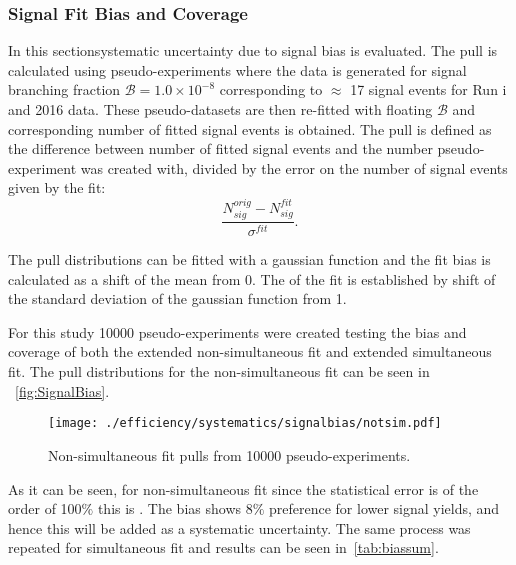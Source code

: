 \subsubsection{Signal Fit Bias and Coverage}
In this section\DIFaddbegin {}\DIFaddend systematic uncertainty due to signal bias is evaluated. The pull is calculated using pseudo-experiments where the data is generated for \DIFaddbegin {}\DIFaddend signal branching fraction $\mathcal{B}= 1.0\times 10^{-8}$ corresponding to $\approx$ 17 signal events for Run \Rn{1} and 2016 data.
These pseudo-datasets are then re-fitted with floating $\mathcal{B}$ and \DIFaddbegin {}\DIFaddend corresponding number of fitted signal events is obtained. The pull is defined as the difference between number of fitted signal events and the number \DIFdelbegin {}\DIFdelend \DIFaddbegin {}\DIFaddend pseudo-experiment was created with, divided by the error on the number of signal events given by the fit:
\begin{equation}
\frac{N^{orig}_{sig}-N^{fit}_{sig}}{\sigma^{fit}}.
\end{equation}

The pull distributions can be fitted with a gaussian function and the fit bias is calculated as a shift of the mean from 0. The \DIFdelbegin {}\DIFdelend \DIFaddbegin {}\DIFaddend of the fit is established by shift of the standard deviation of the gaussian function from 1.

For this study 10000 pseudo-experiments were created testing the bias and coverage of both the extended non-simultaneous fit and extended simultaneous fit. The pull distributions for the non-simultaneous fit can be seen in ~\autoref{fig:SignalBias}.
\begin{figure}[H]
\centering
\texttt{[image: ./efficiency/systematics/signalbias/notsim.pdf]}
\caption{Non-simultaneous fit pulls from 10000 pseudo-experiments.}
\label{fig:SignalBias}
\end{figure}

As it can be seen, for \DIFaddbegin {}\DIFaddend non-simultaneous fit \DIFdelbegin {}\DIFdelend \DIFaddbegin {}\DIFaddend since the statistical error is of the order of 100$\%$ this is \DIFdelbegin {}\DIFdelend \DIFaddbegin {}\DIFaddend .
The bias shows 8$\%$ preference for lower signal yields, and hence this will be added as a systematic uncertainty. The same process was repeated for \DIFaddbegin {}\DIFaddend simultaneous fit and results can be seen in~\autoref{tab:biassum}. 

